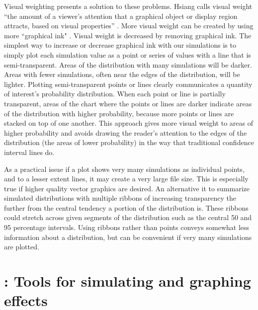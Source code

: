 \documentclass[nojss]{jss}\usepackage[]{graphicx}\usepackage[]{color}
\begin{document}
Visual weighting presents a solution to these problems. Hsiang calls visual weight ``the amount of a viewer's attention that a graphical object or display region attracts, based on visual properties'' \citeyearpar[p. 3]{Hsiang2012}. More visual weight can be created by using more ``graphical ink" \citep{Tufte2001}. Visual weight is decreased by removing graphical ink. The simplest way to increase or decrease graphical ink with our simulations is to simply plot each simulation value as a point or series of values with a line that is semi-transparent. Areas of the distribution with many simulations will be darker. Areas with fewer simulations, often near the edges of the distribution, will be lighter. Plotting semi-transparent points or lines clearly communicates a quantity of interest's probability distribution. When each point or line is partially transparent, areas of the chart where the points or lines are darker indicate areas of the distribution with higher probability, because more points or lines are stacked on top of one another. This approach gives more visual weight to areas of higher probability and avoids drawing the reader's attention to the edges of the distribution (the areas of lower probability) in the way that traditional confidence interval lines do.

As a practical issue if a plot shows very many simulations as individual points, and to a lesser extent lines, it may create a very large file size. This is especially true if higher quality vector graphics are desired. An alternative it to summarize simulated distributions with multiple ribbons of increasing transparency the further from the central tendency a portion of the distribution is. These ribbons could stretch across given segments of the distribution such as the central 50 and 95 percentage intervals. Using ribbons rather than points conveys somewhat less information about a distribution, but can be convenient if very many simulations are plotted.

\section[simPH: Tools]{: Tools for simulating and graphing effects}
\end{document}
